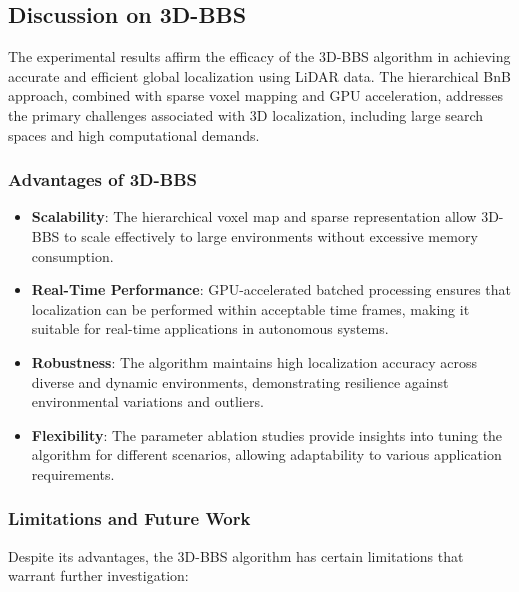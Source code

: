\subsection{Discussion on 3D-BBS}
The experimental results affirm the efficacy of the 3D-BBS algorithm in achieving accurate and efficient global localization using LiDAR data. The hierarchical BnB approach, combined with sparse voxel mapping and GPU acceleration, addresses the primary challenges associated with 3D localization, including large search spaces and high computational demands.

\subsubsection{Advantages of 3D-BBS}
\begin{itemize}
    \item \textbf{Scalability}: The hierarchical voxel map and sparse representation allow 3D-BBS to scale effectively to large environments without excessive memory consumption.
    \item \textbf{Real-Time Performance}: GPU-accelerated batched processing ensures that localization can be performed within acceptable time frames, making it suitable for real-time applications in autonomous systems.
    \item \textbf{Robustness}: The algorithm maintains high localization accuracy across diverse and dynamic environments, demonstrating resilience against environmental variations and outliers.
    \item \textbf{Flexibility}: The parameter ablation studies provide insights into tuning the algorithm for different scenarios, allowing adaptability to various application requirements.
\end{itemize}

\subsubsection{Limitations and Future Work}
Despite its advantages, the 3D-BBS algorithm has certain limitations that warrant further investigation:

